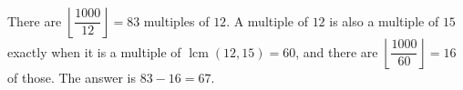 There are $\left\lfloor\dfrac{1000}{12}\right\rfloor=83$ multiples of $12$. A multiple of $12$ is also a multiple of $15$ exactly when it is a multiple of $\operatorname{lcm}(12,15)=60$, and there are $\left\lfloor\dfrac{1000}{60}\right\rfloor=16$ of those. The answer is $83-16=\boxed{67}$.
